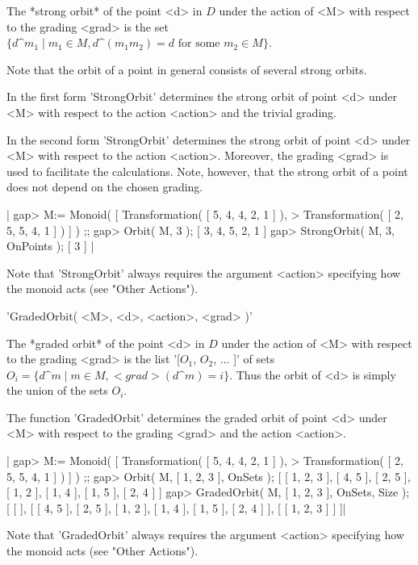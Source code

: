 The *strong orbit* of the point <d>  in $D$ under the  action of <M> with
respect  to the  grading <grad> is  the  set $\{d\^{m_1} \mid  m_1 \in M,
d\^(m_1 m_2) = d \mbox{ for some } m_2 \in M\}$.

Note that  the orbit  of a point   in general consists of several  strong
orbits.

In the first form 'StrongOrbit' determines  the strong orbit of point <d>
under <M> with respect to the  action <action> and the trivial grading.

In the second form 'StrongOrbit' determines the strong orbit of point <d>
under <M>  with respect  to the action   <action>.  Moreover, the grading
<grad>  is used to facilitate the  calculations.  Note, however, that the
strong orbit of a point does not depend on the chosen grading.

|    gap> M:= Monoid( [ Transformation( [ 5, 4, 4, 2, 1 ] ), 
    > Transformation( [ 2, 5, 5, 4, 1 ] ) ] ) ;;
    gap> Orbit( M, 3 );
    [ 3, 4, 5, 2, 1 ]
    gap> StrongOrbit( M, 3, OnPoints );
    [ 3 ] |
    
Note that 'StrongOrbit' always requires  the argument <action> specifying
how the monoid acts (see "Other Actions").


'GradedOrbit( <M>, <d>, <action>, <grad> )'

The *graded orbit* of the point <d>  in $D$ under the  action of <M> with
respect to the grading <grad> is the list '[$O_1$, $O_2$, ...  ]' of sets
$O_i = \{d\^m \mid m \in M, <grad>(d\^m)  = i\}$.  Thus  the orbit of <d>
is simply the union of the sets $O_i$.

The function 'GradedOrbit' determines the graded orbit of point <d> under
<M> with respect to the grading <grad> and the action <action>.

|    gap> M:= Monoid( [ Transformation( [ 5, 4, 4, 2, 1 ] ), 
    > Transformation( [ 2, 5, 5, 4, 1 ] ) ] ) ;;
    gap> Orbit( M, [ 1, 2, 3 ], OnSets );
    [ [ 1, 2, 3 ], [ 4, 5 ], [ 2, 5 ], [ 1, 2 ], [ 1, 4 ], [ 1, 5 ], 
      [ 2, 4 ] ]
    gap> GradedOrbit( M, [ 1, 2, 3 ], OnSets, Size );
    [ [  ], [ [ 4, 5 ], [ 2, 5 ], [ 1, 2 ], [ 1, 4 ], [ 1, 5 ], [ 2, 4 ] ],
    [ [ 1, 2, 3 ] ] ]|

Note that 'GradedOrbit' always requires  the argument <action> specifying
how the monoid acts (see "Other Actions").


